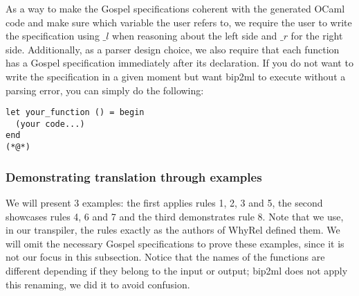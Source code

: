 As a way to make the Gospel specifications coherent with the generated OCaml code and make sure which variable the user refers to, we require the user to write the specification using $\_l$ when reasoning about the left side and $\_r$ for the right side.
Additionally, as a parser design choice, we also require that each function has a Gospel specification immediately after its declaration.
If you do not want to write the specification in a given moment but want bip2ml to execute without a parsing error, you can simply do the following:
\begin{lstlisting}[mathescape, basicstyle=\ttfamily, columns=flexible,
                    emph={type, and, let, rec, if, then, else, mod, in, for, while, do, done, to, begin, end, assert, match, with, of, open, include,ref},
                    emphstyle=\ttfamily\bfseries\color{myorange}]
let your_function () = begin
  (your code...)
end
(*@*)
\end{lstlisting}


\subsubsection{Demonstrating translation through examples}
\label{subsubsec:translator_printer_examples}

We will present 3 examples: the first applies rules 1, 2, 3 and 5, the second showcases rules 4, 6 and 7 and the third demonstrates rule 8.
Note that we use, in our transpiler, the rules exactly as the authors of WhyRel defined them. 
We will omit the necessary Gospel specifications to prove these examples, since it is not our focus in this subsection.
Notice that the names of the functions are different depending if they belong to the input or output; bip2ml does not apply this renaming, we did it to avoid confusion.

